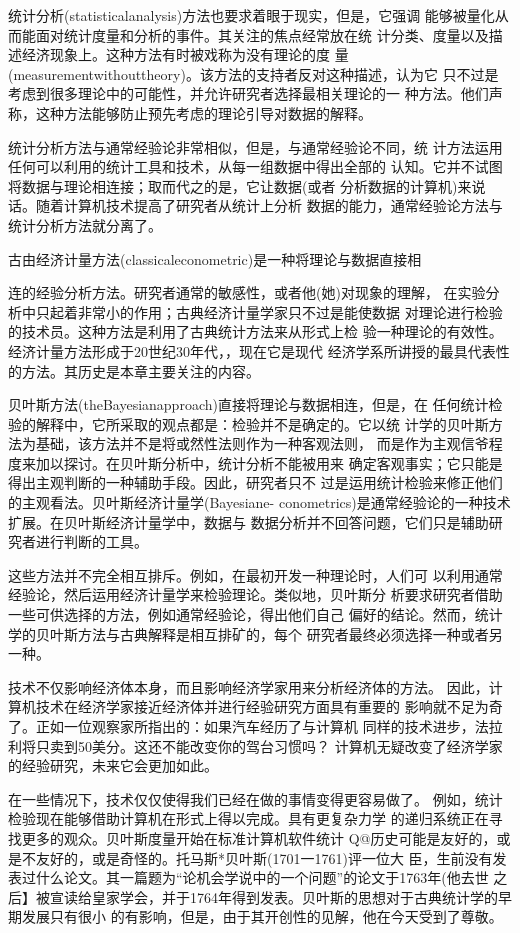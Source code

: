 统计分析(statisticalanalysis)方法也要求着眼于现实，但是，它强调
能够被量化从而能面对统计度量和分析的事件。其关注的焦点经常放在统
计分类、度量以及描述经济现象上。这种方法有时被戏称为没有理论的度
量(measurementwithouttheory)。该方法的支持者反对这种描述，认为它
只不过是考虑到很多理论中的可能性，并允许研究者选择最相关理论的一
种方法。他们声称，这种方法能够防止预先考虑的理论引导对数据的解释。

统计分析方法与通常经验论非常相似，但是，与通常经验论不同，统
计方法运用任何可以利用的统计工具和技术，从每一组数据中得出全部的
认知。它并不试图将数据与理论相连接；取而代之的是，它让数据(或者
分析数据的计算机)来说话。随着计算机技术提高了研究者从统计上分析
数据的能力，通常经验论方法与统计分析方法就分离了。

古由经济计量方法(classicaleconometric)是一种将理论与数据直接相

连的经验分析方法。研究者通常的敏感性，或者他(她)对现象的理解，
在实验分析中只起着非常小的作用；古典经济计量学家只不过是能使数据
对理论进行检验的技术员。这种方法是利用了古典统计方法来从形式上检
验一种理论的有效性。经济计量方法形成于20世纪30年代，，现在它是现代
经济学系所讲授的最具代表性的方法。其历史是本章主要关注的内容。

贝叶斯方法(theBayesianapproach)直接将理论与数据相连，但是，在
任何统计检验的解释中，它所采取的观点都是：检验并不是确定的。它以统
计学的贝叶斯方法为基础，该方法并不是将或然性法则作为一种客观法则，
而是作为主观信爷程度来加以探讨。在贝叶斯分析中，统计分析不能被用来
确定客观事实；它只能是得出主观判断的一种辅助手段。因此，研究者只不
过是运用统计检验来修正他们的主观看法。贝叶斯经济计量学(Bayesiane-
conometrics)是通常经验论的一种技术扩展。在贝叶斯经济计量学中，数据与
数据分析并不回答问题，它们只是辅助研究者进行判断的工具。

这些方法并不完全相互排斥。例如，在最初开发一种理论时，人们可
以利用通常经验论，然后运用经济计量学来检验理论。类似地，贝叶斯分
析要求研究者借助一些可供选择的方法，例如通常经验论，得出他们自己
偏好的结论。然而，统计学的贝叶斯方法与古典解释是相互排矿的，每个
研究者最终必须选择一种或者另一种。

技术不仅影响经济体本身，而且影响经济学家用来分析经济体的方法。
因此，计算机技术在经济学家接近经济体并进行经验研究方面具有重要的
影响就不足为奇了。正如一位观察家所指出的：如果汽车经历了与计算机
同样的技术进步，法拉利将只卖到50美分。这还不能改变你的驾台习惯吗？
计算机无疑改变了经济学家的经验研究，未来它会更加如此。

在一些情况下，技术仅仅使得我们已经在做的事情变得更容易做了。
例如，统计检验现在能够借助计算机在形式上得以完成。具有更复杂力学
的递归系统正在寻找更多的观众。贝叶斯度量开始在标准计算机软件统计
Q@历史可能是友好的，或是不友好的，或是奇怪的。托马斯*贝叶斯(1701一1761)评一位大
臣，生前没有发表过什么论文。其一篇题为“论机会学说中的一个问题”的论文于1763年(他去世
之后】被宣读给皇家学会，并于1764年得到发表。贝叶斯的思想对于古典统计学的早期发展只有很小
的有影响，但是，由于其开创性的见解，他在今天受到了尊敬。

